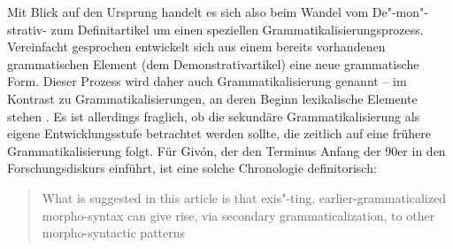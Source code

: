 Mit Blick auf den Ursprung handelt es sich also beim Wandel vom De"-mon"-strativ- zum  Definitartikel um einen speziellen Grammatikalisierungsprozess. Vereinfacht gesprochen entwickelt sich aus einem bereits vorhandenen grammatischen Element (dem Demonstrativartikel) eine neue grammatische Form. Dieser Prozess wird daher auch  Grammatikalisierung \parencite{Givon1991, Detges2002, Szczepaniak2011a} genannt -- im Kontrast zu  Grammatikalisierungen, an deren Beginn lexikalische Elemente stehen \parencite[81]{Traugott2002}.
Es ist allerdings fraglich, ob die sekundäre Grammatikalisierung als eigene Entwicklungsstufe betrachtet werden sollte, die zeitlich auf eine frühere Grammatikalisierung folgt. Für Givón, der den Terminus Anfang der 90er in den Forschungsdiskurs einführt, ist eine solche Chronologie definitorisch: \blockcquote[][193]{Givon1991}{What is suggested in this article is that exis"-ting, earlier-grammaticalized morpho-syntax can give rise, via secondary grammaticalization, to other morpho-syntactic patterns}.

